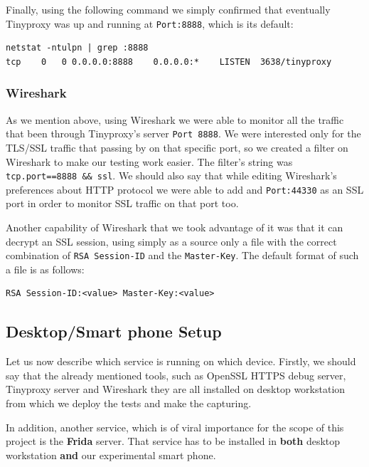 \documentclass[12pt, a4paper]{report}
\begin{document}
Finally, using the following command we simply confirmed that eventually Tinyproxy was up and running at \texttt{Port:8888}, which is its default:

\begin{lstlisting}[frame=single, breaklines=true]
netstat -ntulpn | grep :8888
tcp    0   0 0.0.0.0:8888    0.0.0.0:*    LISTEN  3638/tinyproxy
\end{lstlisting}

\subsubsection{Wireshark}

As we mention above, using Wireshark we were able to monitor all the traffic  that been through Tinyproxy's server \texttt{Port 8888}. We were interested only for the TLS/SSL traffic that passing by on that specific port, so we created a filter on Wireshark to make our testing work easier. The filter's string was \texttt{tcp.port==8888 \&\& ssl}. We should also say that while editing Wireshark's preferences about HTTP protocol we were able to add and \texttt{Port:44330} as an SSL port in order to monitor SSL traffic on that port too.

Another capability of Wireshark that we took advantage of it was that it can decrypt an SSL session, using simply as a source only a file with the correct combination of \texttt{RSA Session-ID} and the \texttt{Master-Key}. The default format of such a file is as follows:
\begin{lstlisting}[frame=single, breaklines=true]
RSA Session-ID:<value> Master-Key:<value>		
\end{lstlisting}

\subsection{Desktop/Smart phone Setup}

Let us now describe which service is running on which device. Firstly, we should say that the already mentioned tools, such as OpenSSL HTTPS debug server, Tinyproxy server and Wireshark they are all installed on desktop workstation from which we deploy the tests and make the capturing.

In addition, another service, which is of viral importance for the scope of this project is the \textbf{Frida} server. That service has to be installed in \textbf{both} desktop workstation \textbf{and} our experimental smart phone.
\end{document}
